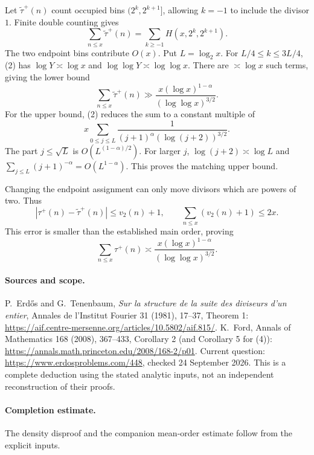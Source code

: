 Let \(\widetilde\tau^+(n)\) count occupied bins \((2^k,2^{k+1}]\),
allowing \(k=-1\) to include the divisor \(1\).
Finite double counting gives
\[
 \sum_{n\leq x}\widetilde\tau^+(n)
 =\sum_{k\geq-1}H(x,2^k,2^{k+1}).
 \tag{3}
\]
The two endpoint bins contribute \(O(x)\).
Put \(L=\log_2 x\). For \(L/4\leq k\leq3L/4\), (2)
has \(\log Y\asymp\log x\) and
\(\log\log Y\asymp\log\log x\).
There are \(\asymp\log x\) such terms, giving the lower bound
\[
 \sum_{n\leq x}\widetilde\tau^+(n)
 \gg \frac{x(\log x)^{1-\alpha}}{(\log\log x)^{3/2}}.
\]
For the upper bound, (2) reduces the sum to a constant multiple of
\[
 x\sum_{0\leq j\leq L}
 \frac1{(j+1)^\alpha(\log(j+2))^{3/2}}.
\]
The part \(j\leq\sqrt L\) is \(O(L^{(1-\alpha)/2})\).
For larger \(j\), \(\log(j+2)\asymp\log L\) and
\(\sum_{j\leq L}(j+1)^{-\alpha}=O(L^{1-\alpha})\).
This proves the matching upper bound.

Changing the endpoint assignment can only move divisors which are
powers of two. Thus
\[
 |\tau^+(n)-\widetilde\tau^+(n)|\leq v_2(n)+1,\qquad
 \sum_{n\leq x}(v_2(n)+1)\leq2x.
\]
This error is smaller than the established main order, proving
\[
 \sum_{n\leq x}\tau^+(n)\asymp
 \frac{x(\log x)^{1-\alpha}}{(\log\log x)^{3/2}}.
 \tag{4}
\]

\paragraph{Sources and scope.}
P.~Erd\H{o}s and G.~Tenenbaum,
\emph{Sur la structure de la suite des diviseurs d'un entier},
Annales de l'Institut Fourier 31 (1981), 17--37, Theorem 1:
\url{https://aif.centre-mersenne.org/articles/10.5802/aif.815/}.
K.~Ford, Annals of Mathematics 168 (2008), 367--433,
Corollary 2 (and Corollary 5 for (4)):
\url{https://annals.math.princeton.edu/2008/168-2/p01}.
Current question: \url{https://www.erdosproblems.com/448},
checked 24 September 2026.
This is a complete deduction using the stated analytic inputs,
not an independent reconstruction of their proofs.

\paragraph{Completion estimate.}
The density disproof and the companion mean-order estimate follow from the explicit inputs.
